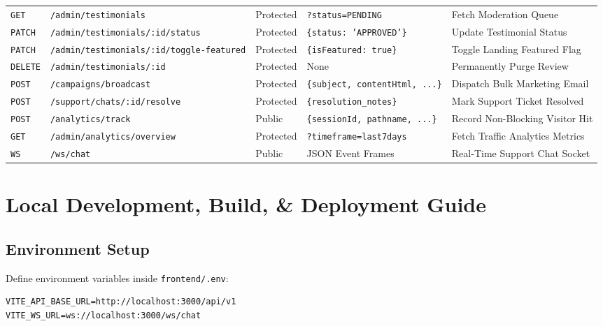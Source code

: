 \documentclass[11pt,a4paper]{article}
\begin{document}
\begin{table}[h!]
\begin{tabular}{lp{3.2cm}lp{3.5cm}l}
\texttt{GET}  & \texttt{/admin/testimonials} & Protected & \texttt{?status=PENDING} & Fetch Moderation Queue \\
\texttt{PATCH}& \texttt{/admin/testimonials/:id/status}& Protected & \texttt{\{status: 'APPROVED'\}} & Update Testimonial Status \\
\texttt{PATCH}& \texttt{/admin/testimonials/:id/toggle-featured}& Protected & \texttt{\{isFeatured: true\}} & Toggle Landing Featured Flag \\
\texttt{DELETE}& \texttt{/admin/testimonials/:id} & Protected & None & Permanently Purge Review \\
\texttt{POST} & \texttt{/campaigns/broadcast} & Protected & \texttt{\{subject, contentHtml, ...\}} & Dispatch Bulk Marketing Email \\
\texttt{POST} & \texttt{/support/chats/:id/resolve}& Protected & \texttt{\{resolution\_notes\}} & Mark Support Ticket Resolved \\
\texttt{POST} & \texttt{/analytics/track} & Public & \texttt{\{sessionId, pathname, ...\}} & Record Non-Blocking Visitor Hit \\
\texttt{GET}  & \texttt{/admin/analytics/overview}& Protected & \texttt{?timeframe=last7days} & Fetch Traffic Analytics Metrics \\
\texttt{WS}   & \texttt{/ws/chat} & Public & JSON Event Frames & Real-Time Support Chat Socket \\
\bottomrule
\end{tabular}
\end{table}

\newpage

\section{Local Development, Build, \& Deployment Guide}

\subsection{Environment Setup}
Define environment variables inside \texttt{frontend/.env}:

\begin{lstlisting}[caption={Frontend Environment Setup (.env)}]
VITE_API_BASE_URL=http://localhost:3000/api/v1
VITE_WS_URL=ws://localhost:3000/ws/chat
\end{lstlisting}
\end{document}
